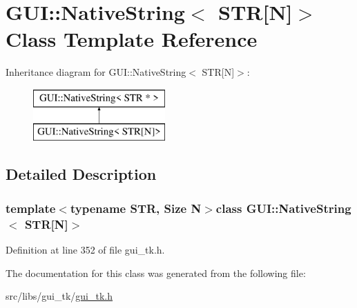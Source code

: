 \hypertarget{classGUI_1_1NativeString_3_01STR[N]_4}{\section{G\-U\-I\-:\-:Native\-String$<$ S\-T\-R\mbox{[}N\mbox{]}$>$ Class Template Reference}
\label{classGUI_1_1NativeString_3_01STR[N]_4}
}
Inheritance diagram for G\-U\-I\-:\-:Native\-String$<$ S\-T\-R\mbox{[}N\mbox{]}$>$\-:\begin{figure}[H]
\begin{center}
\leavevmode
\includegraphics[height=2.000000cm]{classGUI_1_1NativeString_3_01STR[N]_4}
\end{center}
\end{figure}


\subsection{Detailed Description}
\subsubsection*{template$<$typename S\-T\-R, Size N$>$class G\-U\-I\-::\-Native\-String$<$ S\-T\-R\mbox{[}\-N\mbox{]}$>$}



Definition at line 352 of file gui\-\_\-tk.\-h.



The documentation for this class was generated from the following file\-:\begin{DoxyCompactItemize}
\item 
src/libs/gui\-\_\-tk/\hyperlink{gui__tk_8h}{gui\-\_\-tk.\-h}\end{DoxyCompactItemize}
